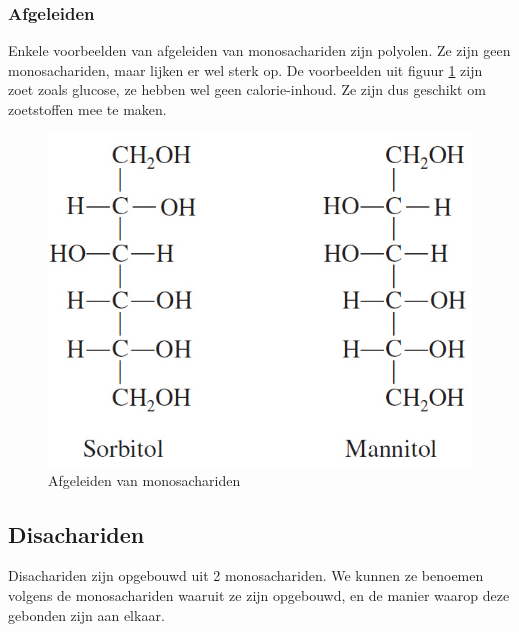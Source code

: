 \documentclass[a4paper,kul]{kulakarticle} %
\begin{document}
\subsubsection{Afgeleiden}
Enkele voorbeelden van afgeleiden van monosachariden zijn polyolen. Ze zijn geen monosachariden, maar lijken er wel sterk op. De voorbeelden uit figuur \ref{fig:afgeleidenmonosachariden} zijn zoet zoals glucose, ze hebben wel geen calorie-inhoud. Ze zijn dus geschikt om zoetstoffen mee te maken.
\begin{figure}[h]
	\centering
	\includegraphics[width=0.4\linewidth]{AfgeleidenMonosachariden}
	\caption[Afgeleiden]{Afgeleiden van monosachariden}
	\label{fig:afgeleidenmonosachariden}
\end{figure}

\subsection{Disachariden}
Disachariden zijn opgebouwd uit 2 monosachariden. We kunnen ze benoemen volgens de monosachariden waaruit ze zijn opgebouwd, en de manier waarop deze gebonden zijn aan elkaar.
\end{document}
